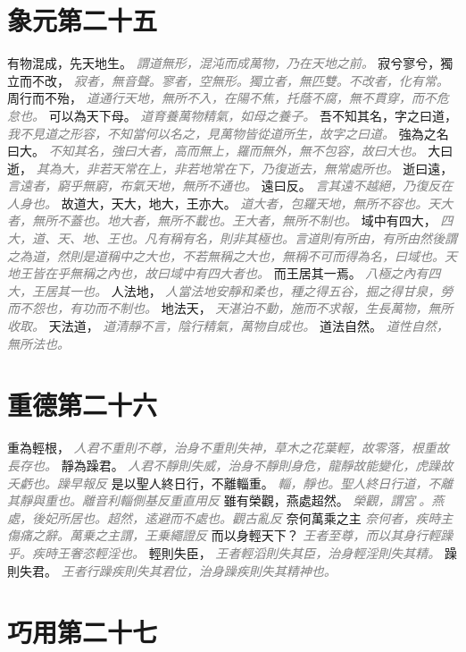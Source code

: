 \documentclass[a4paper,zihao=-4,oneside,landscape,UTF8]{ctexart}
\newcommand{\zhushi}[1]{\scriptsize{\textit{\textcolor{gray}{#1}}}\normalsize}
\begin{document}
\section{象元第二十五}

有物混成，先天地生。
\zhushi{謂道無形，混沌而成萬物，乃在天地之前。}
寂兮寥兮，獨立而不改，
\zhushi{寂者，無音聲。寥者，空無形。獨立者，無匹雙。不改者，化有常。}
周行而不殆，
\zhushi{道通行天地，無所不入，在陽不焦，托蔭不腐，無不貫穿，而不危怠也。}
可以為天下母。
\zhushi{道育養萬物精氣，如母之養子。}
吾不知其名，字之曰道，
\zhushi{我不見道之形容，不知當何以名之，見萬物皆從道所生，故字之曰道。}
強為之名曰大。
\zhushi{不知其名，強曰大者，高而無上，羅而無外，無不包容，故曰大也。}
大曰逝，
\zhushi{其為大，非若天常在上，非若地常在下，乃復逝去，無常處所也。}
逝曰遠，
\zhushi{言遠者，窮乎無窮，布氣天地，無所不通也。}
遠曰反。
\zhushi{言其遠不越絕，乃復反在人身也。}
故道大，天大，地大，王亦大。
\zhushi{道大者，包羅天地，無所不容也。天大者，無所不蓋也。地大者，無所不載也。王大者，無所不制也。}
域中有四大，
\zhushi{四大，道、天、地、王也。凡有稱有名，則非其極也。言道則有所由，有所由然後謂之為道，然則是道稱中之大也，不若無稱之大也，無稱不可而得為名，曰域也。天地王皆在乎無稱之內也，故曰域中有四大者也。}
而王居其一焉。
\zhushi{八極之內有四大，王居其一也。}
人法地，
\zhushi{人當法地安靜和柔也，種之得五谷，掘之得甘泉，勞而不怨也，有功而不制也。}
地法天，
\zhushi{天湛泊不動，施而不求報，生長萬物，無所收取。}
天法道，
\zhushi{道清靜不言，陰行精氣，萬物自成也。}
道法自然。
\zhushi{道性自然，無所法也。}


\section{重德第二十六}

重為輕根，
\zhushi{人君不重則不尊，治身不重則失神，草木之花葉輕，故零落，根重故長存也。}
靜為躁君。
\zhushi{人君不靜則失威，治身不靜則身危，龍靜故能變化，虎躁故夭虧也。躁早報反}
是以聖人終日行，不離輜重。
\zhushi{輜，靜也。聖人終日行道，不離其靜與重也。離音利輜側基反重直用反}
雖有榮觀，燕處超然。
\zhushi{榮觀，謂宮𨵗。燕處，後妃所居也。超然，逺避而不處也。觀古亂反}
奈何萬乘之主
\zhushi{奈何者，疾時主傷痛之辭。萬乗之主謂，王乗繩證反}
而以身輕天下？
\zhushi{王者至尊，而以其身行輕躁乎。疾時王奢恣輕淫也。}
輕則失臣，
\zhushi{王者輕滔則失其臣，治身輕淫則失其精。}
躁則失君。
\zhushi{王者行躁疾則失其君位，治身躁疾則失其精神也。}


\section{巧用第二十七}
\end{document}
